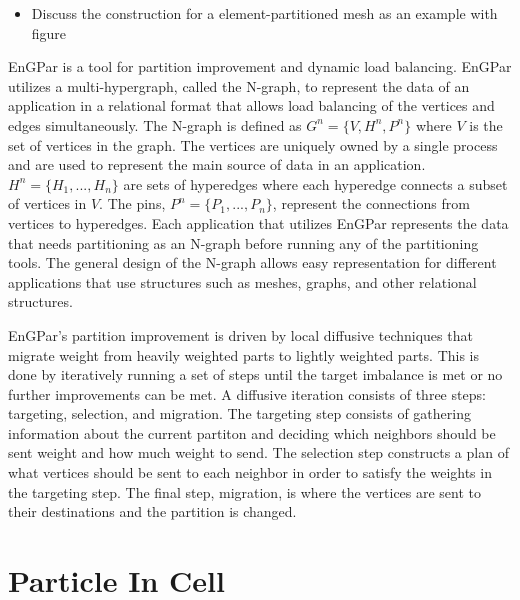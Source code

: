 \documentclass[conference]{IEEEtran}
\begin{document}
\begin{itemize}
\item Discuss the construction for a element-partitioned mesh as an example with figure
\end{itemize}

EnGPar is a tool for partition improvement and dynamic load balancing. EnGPar
utilizes a multi-hypergraph, called the N-graph, to represent the data of an
application in a relational format that allows load balancing of the vertices
and edges simultaneously. The N-graph is defined as $G^n = \{V, H^n, P^n\}$ where
$V$ is the set of vertices in the graph. The vertices are uniquely owned by a single
process and are used to represent the main source of data in an application.
$H^n = \{H_1, ..., H_n\}$ are sets of hyperedges where each hyperedge connects a
subset of vertices in $V$. The pins, $P^n = \{P_1,...,P_n\}$, represent the connections from
vertices to hyperedges. Each application that utilizes EnGPar represents the data
that needs partitioning as an N-graph before running any of the partitioning tools.
The general design of the N-graph allows easy representation for different applications
that use structures such as meshes, graphs, and other relational structures.


EnGPar's partition improvement is driven by local diffusive techniques that migrate weight
from heavily weighted parts to lightly weighted parts. This is done by iteratively running
a set of steps until the target imbalance is met or no further improvements can be met.
A diffusive iteration consists of three steps: targeting, selection, and migration.
The targeting step consists of gathering information about the current partiton and deciding
which neighbors should be sent weight and how much weight to send. The selection step constructs
a plan of what vertices should be sent to each neighbor in order to satisfy the weights in
the targeting step. The final step, migration, is where the vertices are sent to their
destinations and the partition is changed.

\section{Particle In Cell}
\end{document}
